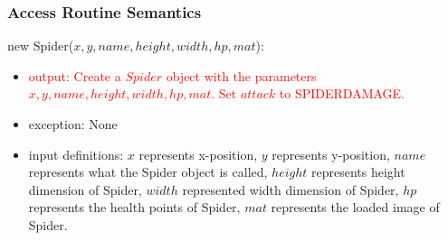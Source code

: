 \documentclass[12pt]{article}
\newcommand{\m}[1]{\mbox{#1}}
\begin{document}

\subsubsection*{Access Routine Semantics}


new Spider($x, y, name, height, width, hp, mat$):
\begin{itemize}
    \item \textcolor{red}{output: Create a $Spider$ object with the parameters $x, y, name, height, width, hp, mat$. Set $attack$ to SPIDERDAMAGE.}
    \item exception: None
    \item input definitions: $x$ represents x-position, $y$ represents y-position, $name$ represents what the Spider object is called, $height$ represents height dimension of Spider, $width$ represented width dimension of Spider, $hp$ represents the health points of Spider, $mat$ represents the loaded image of Spider.
\end{itemize}

\end{document}
